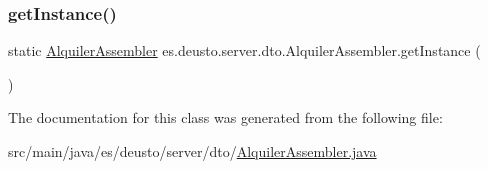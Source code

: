 \mbox{\label{classes_1_1deusto_1_1server_1_1dto_1_1_alquiler_assembler_a6a6df1d924b88c6aac0b4b0a6c88e111}} 
\subsubsection{\texorpdfstring{getInstance()}{getInstance()}}
{\footnotesize\ttfamily static \mbox{\hyperlink{classes_1_1deusto_1_1server_1_1dto_1_1_alquiler_assembler}{Alquiler\+Assembler}} es.\+deusto.\+server.\+dto.\+Alquiler\+Assembler.\+get\+Instance (\begin{DoxyParamCaption}{ }\end{DoxyParamCaption})\hspace{0.3cm}{\ttfamily [static]}}



The documentation for this class was generated from the following file\+:\begin{DoxyCompactItemize}
\item 
src/main/java/es/deusto/server/dto/\mbox{\hyperlink{_alquiler_assembler_8java}{Alquiler\+Assembler.\+java}}\end{DoxyCompactItemize}
